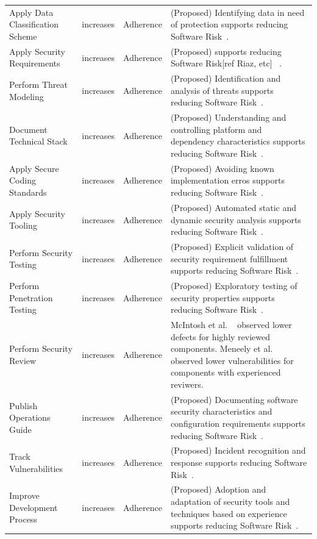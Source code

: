 \begin{table}[!htbp]
\begin{scriptsize}
\begin{tabular}{p{1.75cm}p{1cm}p{1cm}p{6cm}}
			Apply Data Classification Scheme & increases & 	Adherence & (Proposed) Identifying data in need of protection supports reducing Software Risk~\cite{morrison2017surveying}.\\	
			Apply Security Requirements	&	increases	&	Adherence & (Proposed)  supports reducing Software Risk[ref Riaz, etc] ~\cite{morrison2017surveying}.\\
			Perform Threat Modeling &	increases &	Adherence &(Proposed) Identification and analysis of threats supports reducing Software Risk~\cite{morrison2017surveying}. \\	
			Document Technical Stack &	increases &	Adherence & (Proposed) Understanding and controlling platform and dependency characteristics supports reducing Software Risk~\cite{morrison2017surveying}.\\	
			Apply Secure Coding Standards &	increases	& Adherence & (Proposed)  Avoiding known implementation erros supports reducing Software Risk~\cite{morrison2017surveying}.\\
			Apply Security Tooling &	increases &	Adherence & (Proposed)  Automated static and dynamic security analysis supports reducing Software Risk~\cite{morrison2017surveying}.\\
			Perform Security Testing &	increases &	Adherence & (Proposed)  Explicit validation of security requirement fulfillment supports reducing Software Risk~\cite{morrison2017surveying}.\\	
			Perform Penetration Testing &	increases &	Adherence	& (Proposed)  Exploratory testing of security properties supports reducing Software Risk~\cite{morrison2017surveying}.\\
			Perform Security Review &	increases &	Adherence	&  McIntosh et al. ~\cite{mcintosh2014the} observed lower defects for highly reviewed components. Meneely et al. ~\cite{meneely2014empirical} observed lower vulnerabilities for components with experienced reviwers. \\
			Publish Operations Guide &	increases	& Adherence & (Proposed) Documenting software security characteristics and configuration requirements supports reducing Software Risk~\cite{morrison2017surveying}.\\
			Track Vulnerabilities &	increases &	Adherence & (Proposed) Incident recognition and response supports reducing Software Risk~\cite{morrison2017surveying}.\\	
			Improve Development Process &	increases &	Adherence & (Proposed)  Adoption and adaptation of security tools and techniques based on experience supports reducing Software Risk~\cite{morrison2017surveying}.\\	

\end{tabular}
\end{scriptsize}
\end{table}

